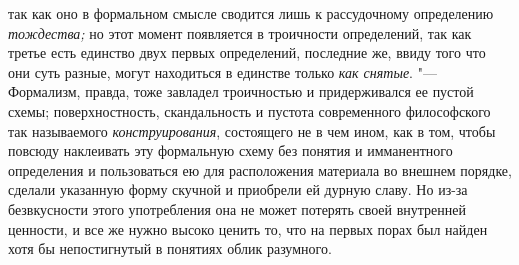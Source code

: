 так как оно в формальном смысле сводится лишь к рассудочному
определению {\em тождества;}
но этот момент появляется в троичности определений, так как
третье есть единство двух первых определений, последние же, ввиду того что
они суть разные, могут находиться в единстве только
{\em как снятые}. "---
Формализм, правда, тоже завладел троичностью и
придерживался ее пустой схемы; поверхностность, скандальность и пустота
современного философского так называемого {\em конструирования},
состоящего не в чем ином, как в том, чтобы повсюду наклеивать
эту формальную схему без понятия и имманентного определения и пользоваться
ею для расположения материала во внешнем порядке, сделали указанную форму
скучной и приобрели ей дурную
славу.
Но из-за безвкусности этого употребления она не может
потерять своей внутренней ценности, и все же нужно высоко ценить то, что на
первых порах был найден хотя бы непостигнутый в понятиях облик разумного.

